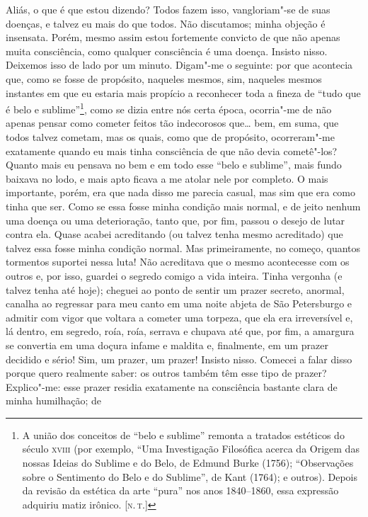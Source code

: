 Aliás, o que é que estou dizendo? Todos fazem isso, vangloriam"-se de
suas doenças, e talvez eu mais do que todos. Não discutamos; minha
objeção é insensata. Porém, mesmo assim estou fortemente convicto de que
não apenas muita consciência, como qualquer consciência é uma doença.
Insisto nisso. Deixemos isso de lado por um minuto. Digam"-me o seguinte:
por que acontecia que, como se fosse de propósito, naqueles mesmos, sim,
naqueles mesmos instantes em que eu estaria mais propício a reconhecer
toda a fineza de ``tudo que é belo e sublime''\footnote{A união dos
  conceitos de ``belo e sublime'' remonta a tratados estéticos do século
  \textsc{xviii} (por exemplo, ``Uma Investigação Filosófica acerca da Origem das
  nossas Ideias do Sublime e do Belo, de Edmund Burke (1756);
  ``Observações sobre o Sentimento do Belo e do Sublime'', de Kant
  (1764); e outros). Depois da revisão da estética da arte ``pura'' nos
  anos 1840--1860, essa expressão adquiriu matiz irônico. {[}\textsc{n.\,t.}{]}},
como se dizia entre nós certa época, ocorria"-me de não apenas pensar
como cometer feitos tão indecorosos que\ldots{} bem, em suma, que todos
talvez cometam, mas os quais, como que de propósito, ocorreram"-me
exatamente quando eu mais tinha consciência de que não devia cometê"-los?
Quanto mais eu pensava no bem e em todo esse ``belo e sublime'', mais
fundo baixava no lodo, e mais apto ficava a me atolar nele por completo.
O mais importante, porém, era que nada disso me parecia casual, mas sim
que era como tinha que ser. Como se essa fosse minha condição mais
normal, e de jeito nenhum uma doença ou uma deterioração, tanto que, por
fim, passou o desejo de lutar contra ela. Quase acabei acreditando (ou
talvez tenha mesmo acreditado) que talvez essa fosse minha condição
normal. Mas primeiramente, no começo, quantos tormentos suportei nessa
luta! Não acreditava que o mesmo acontecesse com os outros e, por isso,
guardei o segredo comigo a vida inteira. Tinha vergonha (e talvez tenha
até hoje); cheguei ao ponto de sentir um prazer secreto, anormal,
canalha ao regressar para meu canto em uma noite abjeta de São
Petersburgo e admitir com vigor que voltara a cometer uma torpeza, que
ela era irreversível e, lá dentro, em segredo, roía, roía, serrava e
chupava até que, por fim, a amargura se convertia em uma doçura infame e
maldita e, finalmente, em um prazer decidido e sério! Sim, um prazer, um
prazer! Insisto nisso. Comecei a falar disso porque quero realmente
saber: os outros também têm esse tipo de prazer? Explico"-me: esse prazer
residia exatamente na consciência bastante clara de minha humilhação; de
